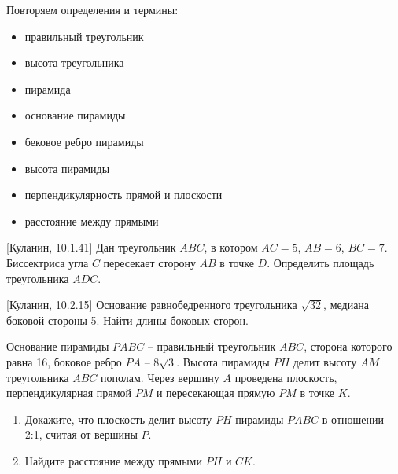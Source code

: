 \documentclass[geometry,a5paper]{pum}
\date{19.03.20}
\begin{document}
Повторяем определения и термины:
\begin{itemize}
  \item правильный треугольник
  \item высота треугольника
  \item пирамида
  \item основание пирамиды
  \item бековое ребро пирамиды
  \item высота пирамиды
  \item перпендикулярность прямой и плоскости
  \item расстояние между прямыми
\end{itemize}

\begin{exercises}
  \begin{question}
    \textcolor{darkcolortheme}{[Куланин, 10.1.41]}
  Дан треугольник $ABC$, в котором $AC=5$, $AB=6$, $BC=7$. Биссектриса угла $C$ пересекает сторону $AB$ в точке $D$. Определить площадь треугольника $ADC$. 
  \end{question}
  \begin{question}
    \textcolor{darkcolortheme}{[Куланин, 10.2.15]}
    Основание равнобедренного треугольника $\sqrt{32}$, медиана боковой стороны 5. Найти длины боковых сторон.
  \end{question}
  \begin{question}
    Основание пирамиды $PABC$ -- правильный треугольник $ABC$, сторона которого равна 16, боковое ребро $PA$ -- $8\sqrt{3}$. Высота пирамиды $PH$ делит высоту $AM$ треугольника $ABC$ пополам. Через вершину $A$ проведена плоскость, перпендикулярная прямой $PM$ и пересекающая прямую $PM$ в точке $K$.
    \begin{enumerate}[label=\asbuk*), ref=\asbuk*]
    \item Докажите, что плоскость делит высоту $PH$ пирамиды $PABC$ в отношении 2:1, считая от вершины $P$.
    \item Найдите расстояние между прямыми $PH$ и $CK$.
  \end{enumerate}
\end{question}
\end{exercises}
\end{document}
